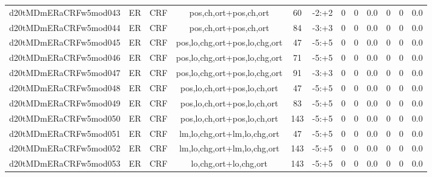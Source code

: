 \documentclass[a4paper]{article}
\begin{document}
\begin{landscape}
\begin{center}
\begin{tabular}{ |c|c|c|c|c|c|c|c|c|c|c|c|}
 
 	
 	\small{ d20tMDmERaCRFw5mod043 } & ER & CRF & pos,ch,ort+pos,ch,ort  &  60 &  -2:+2  &  0 & 0 & 0.0  &  0 & 0 & 0.0 \\
 	

 
 	
 	\small{ d20tMDmERaCRFw5mod044 } & ER & CRF & pos,ch,ort+pos,ch,ort  &  84 &  -3:+3  &  0 & 0 & 0.0  &  0 & 0 & 0.0 \\
 	

 
 	
 	\small{ d20tMDmERaCRFw5mod045 } & ER & CRF & pos,lo,chg,ort+pos,lo,chg,ort  &  47 &  -5:+5  &  0 & 0 & 0.0  &  0 & 0 & 0.0 \\
 	

 
 	
 	\small{ d20tMDmERaCRFw5mod046 } & ER & CRF & pos,lo,chg,ort+pos,lo,chg,ort  &  71 &  -5:+5  &  0 & 0 & 0.0  &  0 & 0 & 0.0 \\
 	

 
 	
 	\small{ d20tMDmERaCRFw5mod047 } & ER & CRF & pos,lo,chg,ort+pos,lo,chg,ort  &  91 &  -3:+3  &  0 & 0 & 0.0  &  0 & 0 & 0.0 \\
 	

 
 	
 	\small{ d20tMDmERaCRFw5mod048 } & ER & CRF & pos,lo,ch,ort+pos,lo,ch,ort  &  47 &  -5:+5  &  0 & 0 & 0.0  &  0 & 0 & 0.0 \\
 	

 
 	
 	\small{ d20tMDmERaCRFw5mod049 } & ER & CRF & pos,lo,ch,ort+pos,lo,ch,ort  &  83 &  -5:+5  &  0 & 0 & 0.0  &  0 & 0 & 0.0 \\
 	

 
 	
 	\small{ d20tMDmERaCRFw5mod050 } & ER & CRF & pos,lo,ch,ort+pos,lo,ch,ort  &  143 &  -5:+5  &  0 & 0 & 0.0  &  0 & 0 & 0.0 \\
 	

 
 	
 	\small{ d20tMDmERaCRFw5mod051 } & ER & CRF & lm,lo,chg,ort+lm,lo,chg,ort  &  47 &  -5:+5  &  0 & 0 & 0.0  &  0 & 0 & 0.0 \\
 	

 
 	
 	\small{ d20tMDmERaCRFw5mod052 } & ER & CRF & lm,lo,chg,ort+lm,lo,chg,ort  &  143 &  -5:+5  &  0 & 0 & 0.0  &  0 & 0 & 0.0 \\
 	

 
 	
 	\small{ d20tMDmERaCRFw5mod053 } & ER & CRF & lo,chg,ort+lo,chg,ort  &  143 &  -5:+5  &  0 & 0 & 0.0  &  0 & 0 & 0.0 \\
 	


\end{tabular}
\end{center}
\end{landscape}
\end{document}
